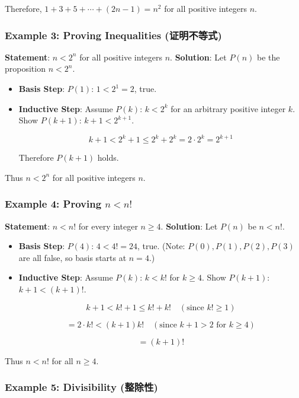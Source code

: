 \documentclass[10pt,a4paper,openany]{ctexbook}
\theoremstyle{definition}
\theoremstyle{remark}
\begin{document}
Therefore, $1 + 3 + 5 + \cdots + (2n-1) = n^2$ for all positive integers $n$.
\vspace{-2pt}

\subsubsection{Example 3: Proving Inequalities (证明不等式)}

\textbf{Statement}: $n < 2^n$ for all positive integers $n$.
\textbf{Solution}:
Let $P(n)$ be the proposition $n < 2^n$.
\begin{itemize}
\item \textbf{Basis Step}: $P(1)$: $1 < 2^1 = 2$, true.
\item \textbf{Inductive Step}: Assume $P(k)$: $k < 2^k$ for an arbitrary positive integer $k$.
Show $P(k+1)$: $k+1 < 2^{k+1}$.

\[
k+1 < 2^k + 1 \le 2^k + 2^k = 2 \cdot 2^k = 2^{k+1}
\]

Therefore $P(k+1)$ holds.


\end{itemize}

Thus $n < 2^n$ for all positive integers $n$.
\vspace{-2pt}

\subsubsection{Example 4: Proving $n < n!$}

\textbf{Statement}: $n < n!$ for every integer $n \ge 4$.
\textbf{Solution}:
Let $P(n)$ be $n < n!$.
\begin{itemize}
\item \textbf{Basis Step}: $P(4)$: $4 < 4! = 24$, true. (Note: $P(0), P(1), P(2), P(3)$ are all false, so basis starts at $n=4$.)
\item \textbf{Inductive Step}: Assume $P(k)$: $k < k!$ for $k \ge 4$.
Show $P(k+1)$: $k+1 < (k+1)!$.

\[
k+1 < k! + 1 \le k! + k! \quad (\text{since } k! \ge 1)
\]

\[
= 2 \cdot k! < (k+1)k! \quad (\text{since } k+1 > 2 \text{ for } k \ge 4)
\]

\[
= (k+1)!
\]


\end{itemize}

Thus $n < n!$ for all $n \ge 4$.
\vspace{-2pt}

\subsubsection{Example 5: Divisibility (整除性)}
\end{document}
